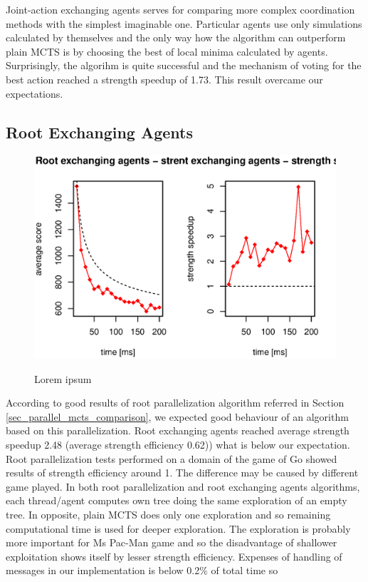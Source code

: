 Joint-action exchanging agents serves for comparing more complex coordination methods with the
simplest imaginable one. Particular agents use only simulations calculated by themselves and
the only way how the algorithm can outperform plain MCTS is by choosing the best of local
minima calculated by agents. Surprisingly, the algorihm is quite successful and the mechanism
of voting for the best action reached a strength speedup of 1.73. This result overcame our
expectations.



\subsection{Root Exchanging Agents}

\begin{figure}
\begin{center}
\includegraphics{img/root-exchange-strength.eps}
\end{center}
\caption{\footnotesize Lorem ipsum}{\footnotesize }
\label{fig_root_exchanging_strength}
\end{figure}


According to good results of root parallelization algorithm referred in Section
\ref{sec_parallel_mcts_comparison}, we expected good behaviour of an algorithm based on this
parallelization. Root exchanging agents reached average strength speedup 2.48 (average strength
efficiency 0.62)) 
what is below our
expectation. Root parallelization tests performed on a domain of the game of Go
\cite{Chaslot2008} showed results of strength efficiency around 1. The difference may be caused
by different game played. In both root parallelization and root exchanging agents algorithms,
each thread/agent computes own tree doing the same exploration of an empty tree. In opposite,
plain MCTS does only one exploration and so remaining computational time is used for deeper
exploration. The exploration is probably more important for Ms Pac-Man game and so the
disadvantage of shallower exploitation shows itself by lesser strength efficiency. Expenses of
handling of messages in our implementation is below 0.2\% of total time so \todo{!}




